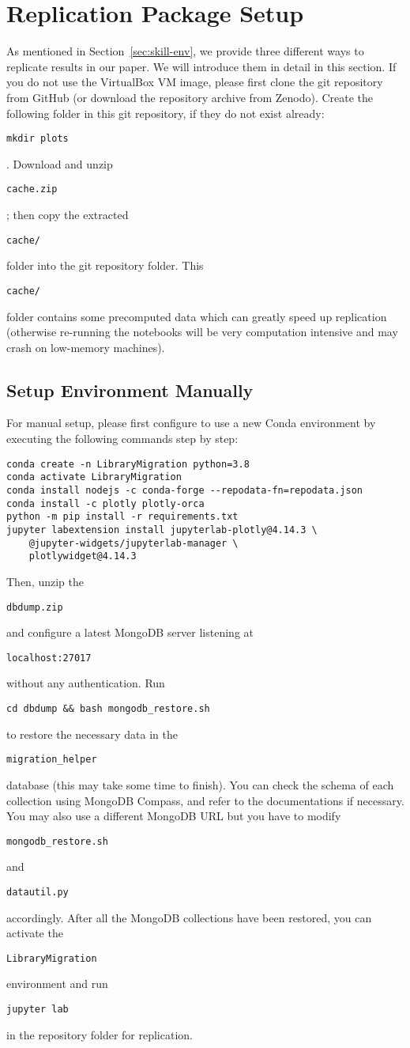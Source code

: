 \documentclass[sigconf]{acmart}
\makeatletter
\newcommand{\Code}[1]{\begin{small}\texttt{#1}\end{small}}
\newcommand{\verbatimfont}[1]{\renewcommand{\verbatim@font}{\ttfamily#1}}
\makeatother
\begin{document}
\section{Replication Package Setup}
\label{sec:setup}

As mentioned in Section~\ref{sec:skill-env}, we provide three different ways to replicate results in our paper.
We will introduce them in detail in this section.
If you do not use the VirtualBox VM image, please first clone the git repository from GitHub (or download the repository archive from Zenodo). 
Create the following folder in this git repository, if they do not exist already: \Code{mkdir plots}. 
Download and unzip \Code{cache.zip}; then copy the extracted \Code{cache/} folder into the git repository folder. 
This \Code{cache/} folder contains some precomputed data which can greatly speed up replication (otherwise re-running the notebooks will be very computation intensive and may crash on low-memory machines).

\subsection{Setup Environment Manually}
\label{sec:manual}

For manual setup, please first configure to use a new Conda environment by executing the following commands step by step:

\verbatimfont{\small}
\begin{verbatim}
conda create -n LibraryMigration python=3.8
conda activate LibraryMigration
conda install nodejs -c conda-forge --repodata-fn=repodata.json
conda install -c plotly plotly-orca
python -m pip install -r requirements.txt
jupyter labextension install jupyterlab-plotly@4.14.3 \
    @jupyter-widgets/jupyterlab-manager \
    plotlywidget@4.14.3
\end{verbatim}

Then, unzip the \Code{dbdump.zip} and configure a latest MongoDB server listening at \Code{localhost:27017} without any authentication.
Run \Code{cd dbdump \&\& bash mongodb\_restore.sh} to restore the necessary data in the \Code{migration\_helper} database (this may take some time to finish).
You can check the schema of each collection using MongoDB Compass, and refer to the documentations if necessary.
You may also use a different MongoDB URL but you have to modify \Code{mongodb\_restore.sh} and \Code{datautil.py} accordingly.
After all the MongoDB collections have been restored, you can activate the \Code{LibraryMigration} environment and run \Code{jupyter lab} in the repository folder for replication.
\end{document}
